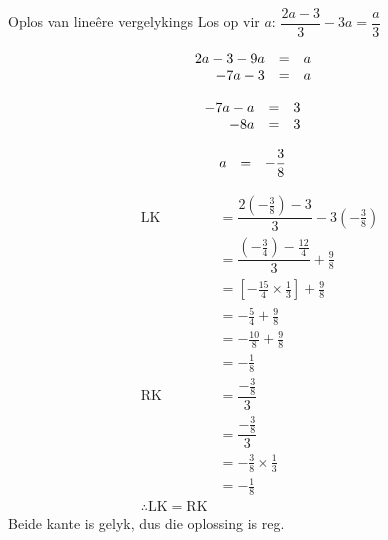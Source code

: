 \begin{wex}
{Oplos van lineêre vergelykings}
{Los op vir $a$: $\dfrac{2a-3}{3}-3a=\dfrac{a}{3}$}
{

\begin{equation*}
    \begin{array}{cccc}\hfill 2a-3 - 9a &= &a\hfill & \\ 
\hfill -7a - 3 &= &a\hfill & 
    \end{array}
\end{equation*}

\begin{equation*}
    \begin{array}{cccc}\hfill -7a -a &= &3\hfill & \\ 
\hfill -8a &= &3\hfill & \\
    \end{array}
\end{equation*}

\begin{equation*}
    \begin{array}{cccc}\hfill a &= & -\dfrac{3}{8}\hfill & \\ 

    \end{array}
\end{equation*}

\begin{equation*}
    \begin{array}{ccll}
 \mbox{LK} &= \dfrac{2(-\frac{3}{8}) - 3}{3} - 3(-\frac{3}{8})\\
  &=\dfrac{(-\frac{3}{4}) - \frac{12}{4}}{3} + \frac{9}{8}\\ 
  &=\left[-\frac{15}{4} \times \frac{1}{3}\right] + \frac{9}{8}\\ 
  &=-\frac{5}{4} + \frac{9}{8}\\ 
  &=-\frac{10}{8} + \frac{9}{8}\\ 
  &=-\frac{1}{8} \\

 \mbox{RK} &= \dfrac{-\frac{3}{8}}{3} \\
  &= \dfrac{-\frac{3}{8}}{3} \\ 
  &= -\frac{3}{8} \times \frac{1}{3} \\ 
  &= -\frac{1}{8} \\ 

\therefore \mbox{LK} = \mbox{RK}
\end{array}
\end{equation*}
Beide kante is gelyk, dus die oplossing is reg.
}
\end{wex}


